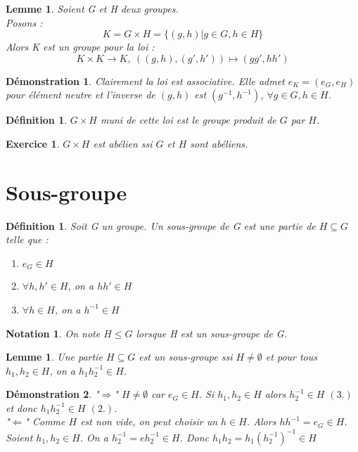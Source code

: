 \documentclass[a4paper, oneside]{report}
\theoremstyle{break}
\newtheorem{defi}[thm]{Définition}
\newtheorem{lemme}[thm]{Lemme}
\newtheorem{nota}[thm]{Notation}
\newtheorem{exo}[thm]{Exercice}
\newtheorem*{demo}{Démonstration}
\newcommand{\x}{\times}
\begin{document}
\begin{lemme}
	Soient G et H deux groupes.\\
	Posons :
	$$K=G\x H=\{(g,h)|g\in G, h\in H \}$$
	Alors K est un groupe pour la loi :
	$$K\x K \rightarrow K,~((g,h),(g',h'))\mapsto (gg',hh')$$
\end{lemme}

\begin{demo}
	Clairement la loi est associative. Elle admet $e_K=(e_G,e_H)$ pour élément neutre et l'inverse de $(g,h)$ est $(g^{-1}, h^{-1})$, $\forall g\in G, h\in H$.
\end{demo}

\begin{defi}
	$G\x H$ muni de cette loi est le groupe produit de $G$ par $H$.
\end{defi}

\begin{exo}
	$G\x H$ est abélien ssi $G$ et $H$ sont abéliens.
\end{exo}

\section{Sous-groupe}

\begin{defi}	
	Soit G un groupe. Un sous-groupe de G est une partie de $H\subseteq G$ telle que :
	\begin{enumerate}
	\item $e_G \in H$
	\item $\forall h,h' \in H$, on a $hh' \in H$
	\item $\forall h\in H$, on a $h^{-1}\in H$
	\end{enumerate}
\end{defi}

\begin{nota}
	On note $H\leq G$ lorsque H est un sous-groupe de G.	
\end{nota}

\begin{lemme}
	Une partie $H\subseteq G$ est un sous-groupe ssi $H\neq \emptyset$ et pour tous $h_1,h_2\in H$, on a $h_1h_2^{-1}\in H$.	
\end{lemme}

\begin{demo}
	"$\Rightarrow$" $H\neq \emptyset$ car $e_G \in H$. Si $h_1,h_2\in H$ alors $h_2^{-1}\in H$ $(3.)$ et donc $h_1h_2^{-1}\in H$ $(2.)$.\\
	"$\Leftarrow$" Comme $H$ est non vide, on peut choisir un $h\in H$. Alors $hh^{-1}=e_G \in H$. Soient $h_1,h_2 \in H$. On a $h_2^{-1}=eh_2^{-1}\in H$. Donc $h_1h_2=h_1(h_2^{-1})^{-1}\in H$	
\end{demo}
\end{document}
